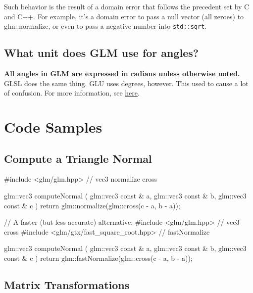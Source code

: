 \documentclass{scrartcl}
\numberwithin{figure}{subsection}
\begin{document}
Such behavior is the result of a domain error that follows the precedent set by C and C++. For example, it's a domain error to pass a null vector (all zeroes) to glm::normalize, or even to pass a negative number into \verb|std::sqrt|.

\subsection{What unit does GLM use for angles?}

\textbf{All angles in GLM are expressed in radians unless otherwise noted.}  GLSL does the same thing.  GLU uses degrees, however.  This used to cause a lot of confusion.  For more information, see \href{http://www.g-truc.net/post-0693.html#menu}{here}.

\newpage{}

\section{Code Samples}

\subsection{Compute a Triangle Normal}

\begin{cppcode}
#include <glm/glm.hpp> // vec3 normalize cross

glm::vec3 computeNormal
(
  glm::vec3 const & a, 
  glm::vec3 const & b,
  glm::vec3 const & c
)
{
  return glm::normalize(glm::cross(c - a, b - a));
}
\end{cppcode}

\begin{cppcode}
// A faster (but less accurate) alternative:
#include <glm/glm.hpp> // vec3 cross
#include <glm/gtx/fast_square_root.hpp> // fastNormalize

glm::vec3 computeNormal
(
  glm::vec3 const & a, 
  glm::vec3 const & b,
  glm::vec3 const & c
)
{
  return glm::fastNormalize(glm::cross(c - a, b - a));
}
\end{cppcode}

\iffalse

\subsection{Matrix Transformations}
\end{document}
